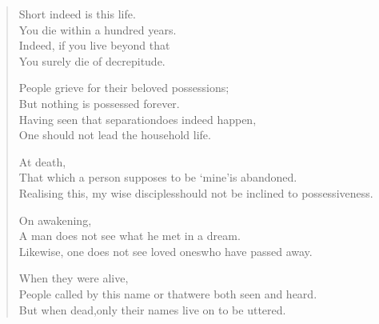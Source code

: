 
\begin{verse}

 Short indeed is this life.\\
You die within a hundred years.\\
Indeed, if you live beyond that\\
You surely die of decrepitude.


 People grieve for their beloved possessions;\\
But nothing is possessed forever.\\
Having seen that separation\newline does indeed happen,\\
One should not lead the household life.


 At death,\\
That which a person supposes to be `mine'\newline is abandoned.\\
Realising this, my wise disciples\newline should not be inclined to possessiveness.


 On awakening,\\
A man does not see what he met in a dream.\\
Likewise, one does not see loved ones\newline who have passed away.


 When they were alive,\\
People called by this name or that\newline were both seen and heard.\\
But when dead,\newline only their names live on to be uttered.


\end{verse}
